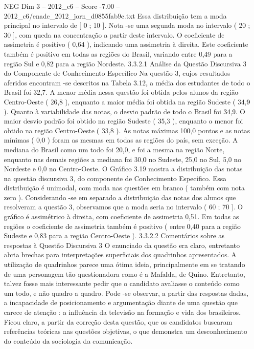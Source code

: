 \begin{textsample}{NEG Dim 3 – 2012\_c6 – Score -7.00 – 2012\_c6/enade\_2012\_jorn\_d0855fab9c.txt}
Essa distribuição tem a moda principal no intervalo de [ 0 ; 10 ].
Nota -se uma segunda moda no intervalo ( 20 ; 30 ], com queda na concentração a partir deste intervalo.
O coeficiente de assimetria é positivo ( 0,64 ), indicando uma assimetria à direita.
Este coeficiente também é positivo em todas as regiões do Brasil, variando entre 0,49 para a região Sul e 0,82 para a região Nordeste. 3.3.2.1 Análise da Questão Discursiva 3 do Componente de Conhecimento Específico Na questão 3, cujos resultados aferidos encontram -se descritos na Tabela 3.12, a média dos estudantes de todo o Brasil foi 32,7.
A menor média nessa questão foi obtida pelos alunos da região Centro-Oeste ( 26,8 ), enquanto a maior média foi obtida na região Sudeste ( 34,9 ).
Quanto à variabilidade das notas, o desvio padrão de todo o Brasil foi 34,9.
O maior desvio padrão foi obtido na região Sudeste ( 35,3 ), enquanto o menor foi obtido na região Centro-Oeste ( 33,8 ).
As notas máximas 100,0 pontos e as notas mínimas ( 0,0 ) foram as mesmas em todas as regiões do país, sem exceção.
A mediana do Brasil como um todo foi 20,0, e foi a mesma na região Norte, enquanto nas demais regiões a mediana foi 30,0 no Sudeste, 25,0 no Sul, 5,0 no Nordeste e 0,0 no Centro-Oeste.
O Gráfico 3.19 mostra a distribuição das notas na questão discursiva 3, do componente de Conhecimento Específico.
Essa distribuição é unimodal, com moda nas questões em branco ( também com nota zero ).
Considerando -se em separado a distribuição das notas dos alunos que resolveram a questão 3, observamos que a moda seria no intervalo ( 60 ; 70 ].
O gráfico é assimétrico à direita, com coeficiente de assimetria 0,51.
Em todas as regiões o coeficiente de assimetria também é positivo ( entre 0,40 para a região Sudeste e 0,83 para a região Centro-Oeste ). 3.3.2.2 Comentários sobre as respostas à Questão Discursiva 3 O enunciado da questão era claro, entretanto abria brechas para interpretações superficiais dos quadrinhos apresentados.
A utilização de quadrinhos parece uma ótima ideia, principalmente em se tratando de uma personagem tão questionadora como é a Mafalda, de Quino.
Entretanto, talvez fosse mais interessante pedir que o candidato avaliasse o conteúdo como um todo, e não quadro a quadro.
Pode -se observar, a partir das respostas dadas, a incapacidade de posicionamento e argumentação diante de uma questão que carece de atenção : a influência da televisão na formação e vida dos brasileiros.
Ficou claro, a partir da correção desta questão, que os candidatos buscaram referências teóricas nas questões objetivas, o que demonstra um desconhecimento do conteúdo da sociologia da comunicação.

\end{textsample}
